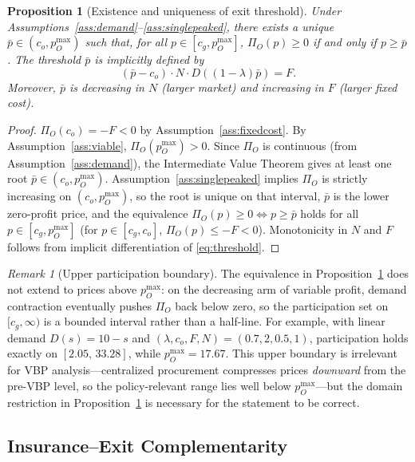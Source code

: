 \documentclass[12pt]{article}
\theoremstyle{plain}
\newtheorem{proposition}{Proposition}
\theoremstyle{definition}
\theoremstyle{remark}
\newtheorem{remark}{Remark}
\newcommand{\pbar}{\bar{p}}
\newcommand{\1}{\mathbf{1}}
\begin{document}
\begin{proposition}[Existence and uniqueness of exit threshold]
\label{prop:threshold}
Under Assumptions~\ref{ass:demand}--\ref{ass:singlepeaked}, there exists a unique $\pbar \in (c_o, p_O^{\max})$ such that, for all $p \in [c_g, p_O^{\max}]$, $\Pi_O(p) \geq 0$ if and only if $p \geq \pbar$. The threshold $\pbar$ is implicitly defined by
\begin{equation}
(\pbar - c_o)\cdot N \cdot D\!\left((1-\lambda)\pbar\right) = F.
\label{eq:threshold}
\end{equation}
Moreover, $\pbar$ is decreasing in $N$ (larger market) and increasing in $F$ (larger fixed cost).
\end{proposition}

\begin{proof}
$\Pi_O(c_o) = -F < 0$ by Assumption~\ref{ass:fixedcost}. By Assumption~\ref{ass:viable}, $\Pi_O(p_O^{\max}) > 0$. Since $\Pi_O$ is continuous (from Assumption~\ref{ass:demand}), the Intermediate Value Theorem gives at least one root $\pbar \in (c_o, p_O^{\max})$. Assumption~\ref{ass:singlepeaked} implies $\Pi_O$ is strictly increasing on $(c_o, p_O^{\max})$, so the root is unique on that interval, $\pbar$ is the lower zero-profit price, and the equivalence $\Pi_O(p) \geq 0 \Leftrightarrow p \geq \pbar$ holds for all $p \in [c_g, p_O^{\max}]$ (for $p \in [c_g, c_o]$, $\Pi_O(p) \leq -F < 0$). Monotonicity in $N$ and $F$ follows from implicit differentiation of \eqref{eq:threshold}.
\end{proof}

\begin{remark}[Upper participation boundary]
\label{rem:upperboundary}
The equivalence in Proposition~\ref{prop:threshold} does not extend to prices above $p_O^{\max}$: on the decreasing arm of variable profit, demand contraction eventually pushes $\Pi_O$ back below zero, so the participation set on $[c_g, \infty)$ is a bounded interval rather than a half-line. For example, with linear demand $D(s) = 10 - s$ and $(\lambda, c_o, F, N) = (0.7, 2, 0.5, 1)$, participation holds exactly on $[2.05,\, 33.28]$, while $p_O^{\max} = 17.67$. This upper boundary is irrelevant for VBP analysis---centralized procurement compresses prices \emph{downward} from the pre-VBP level, so the policy-relevant range lies well below $p_O^{\max}$---but the domain restriction in Proposition~\ref{prop:threshold} is necessary for the statement to be correct.
\end{remark}

\subsection{Insurance--Exit Complementarity}
\end{document}
